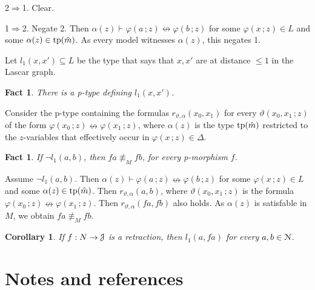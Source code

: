 \documentclass{amsproc}
\makeatletter
\def\J{\EuScript J}
\def\N{\EuScript N}
\def\phi{\varphi}
\def\theta{\vartheta}
\newcounter{thm}
\theoremstyle{mio}
\newtheorem{corollary}[thm]{Corollary}\tcolorboxenvironment{corollary}{mythm}
\newtheorem{fact}[thm]{Fact}\tcolorboxenvironment{fact}{mythm}
\providecommand{\proofNameStyle}{\bfseries}
\renewenvironment{proof}[1][\proofname]{\par
  \pushQED{\qed}%
  \normalfont%
  \trivlist
  \item[\hskip\labelsep
        \proofNameStyle
    #1\@addpunct{.}]\ignorespaces
}{%
  \popQED\endtrivlist\@endpefalse
}
\makeatother
\begin{document}
\begin{proof}
  2$\Rightarrow$1. Clear.

  1$\Rightarrow$2. Negate 2.
  Then $\alpha(z)\vdash\phi(a\,;z)\nleftrightarrow\phi(b\,;z)$ for some $\phi(x\,;z)\in L$ and some $\alpha(z)\in {\rm tp}(\hat m)$.
  As every model witnesses $\alpha(z)$, this negates 1.
\end{proof}

Let $l_1(x,x')\subseteq L$ be the type that says that $x,x'$ are at distance $\le 1$ in the Lascar graph.

\begin{fact}  
  There is a p-type defining $l_1(x,x')$.
\end{fact}

\begin{proof}
  Consider the p-type containing the formulas $r_{\theta,\alpha}(x_0,x_1)$ for every $\theta(x_0,x_1\,;z)$ of the form $\phi(x_0\,;z)\nleftrightarrow\phi(x_1\,;z)$, where $\alpha(z)$ is the type ${\rm tp}(\hat m)$ restricted to the $z$-variables that effectively occur in $\phi(x\,;z)\in\Delta$.
\end{proof}

\begin{fact}
  If $\neg l_1(a,b)$, then $fa\not\equiv_M fb$, for every p-morphism $f$.
\end{fact}

\begin{proof}
  Assume $\neg l_1(a,b)$. Then $\alpha(z)\vdash\phi(a\,;z)\nleftrightarrow\phi(b\,;z)$ for some $\phi(x\,;z)\in L$ and some $\alpha(z)\in {\rm tp}(\hat m)$. 
  Then $r_{\theta,\alpha}(a,b)$, where $\theta(x_0,x_1\,;z)$ is the formula $\phi(x_0\,;z)\nleftrightarrow\phi(x_1\,;z)$.
  Then  $r_{\theta,\alpha}(fa,fb)$ also holds.
  As $\alpha(z)$ is satisfable in $M$, we obtain $fa\not\equiv_M fb$.
\end{proof}

\begin{corollary}
  If $f:N\to\J$ is a retraction, then $l_1(a,fa)$ for every $a,b\in\N$.
\end{corollary}




\section{Notes and references}

\begin{biblist}[]\normalsize

\smallskip
{}\smallskip
{}\smallskip
\end{biblist}
\end{document}
